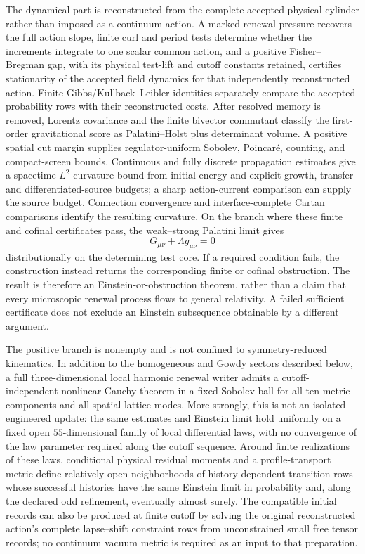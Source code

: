 \documentclass[11pt]{article}
\theoremstyle{definition}
\theoremstyle{remark}
\begin{document}
The dynamical part is reconstructed from the complete accepted physical
cylinder rather than imposed as a continuum action.  A marked renewal pressure
recovers the full action slope, finite curl and period tests determine whether
the increments integrate to one scalar common action, and a positive
Fisher--Bregman gap, with its physical test-lift and cutoff constants retained,
certifies stationarity of the accepted field dynamics for that independently
reconstructed action.  Finite Gibbs/Kullback--Leibler identities separately
compare the accepted probability rows with their reconstructed costs.  After resolved memory is removed,
Lorentz covariance and the finite bivector commutant classify the first-order
gravitational score as Palatini--Holst plus determinant volume.  A positive
spatial cut margin supplies regulator-uniform Sobolev, Poincar\'e, counting,
and compact-screen bounds.  Continuous and fully discrete propagation estimates
give a spacetime $L^2$ curvature bound from initial energy and explicit
growth, transfer and differentiated-source budgets; a sharp action-current
comparison can supply the source budget.  Connection convergence and
interface-complete Cartan comparisons identify the resulting curvature.  On the branch where these finite and cofinal
certificates pass, the weak--strong Palatini limit gives
\begin{equation}
\boxed{G_{\mu\nu}+\Lambda g_{\mu\nu}=0}
\end{equation}
distributionally on the determining test core.  If a required condition fails,
the construction instead returns the corresponding finite or cofinal
obstruction.  The result is therefore an Einstein-or-obstruction theorem,
rather than a claim that every microscopic renewal process flows to general
relativity.  A failed sufficient certificate does not exclude an Einstein
subsequence obtainable by a different argument.

The positive branch is nonempty and is not confined to symmetry-reduced
kinematics.  In addition to the homogeneous and Gowdy sectors described
below, a full three-dimensional local harmonic renewal writer admits a
cutoff-independent nonlinear Cauchy theorem in a fixed Sobolev ball for all
ten metric components and all spatial lattice modes.  More strongly, this is
not an isolated engineered update: the same estimates and Einstein limit hold
uniformly on a fixed open $55$-dimensional family of local differential laws,
with no convergence of the law parameter required along the cutoff sequence.
Around finite realizations of these laws, conditional physical residual
moments and a profile-transport metric define relatively open neighborhoods
of history-dependent transition rows whose successful histories have the same
Einstein limit in probability and, along the declared odd refinement, eventually
almost surely.  The compatible initial records can also be produced at finite
cutoff by solving the original reconstructed action's complete lapse--shift
constraint rows from unconstrained small free tensor records; no continuum
vacuum metric is required as an input to that preparation.
\end{document}
